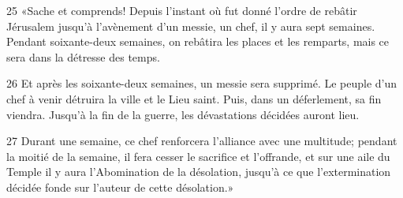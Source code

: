 
25 «Sache et comprends! Depuis l’instant où fut donné l’ordre de rebâtir Jérusalem jusqu’à l’avènement d’un messie, un chef, il y aura sept semaines. Pendant soixante-deux semaines, on rebâtira les places et les remparts, mais ce sera dans la détresse des temps.

26 Et après les soixante-deux semaines, un messie sera supprimé. Le peuple d’un chef à venir détruira la ville et le Lieu saint. Puis, dans un déferlement, sa fin viendra. Jusqu’à la fin de la guerre, les dévastations décidées auront lieu.

27 Durant une semaine, ce chef renforcera l’alliance avec une multitude; pendant la moitié de la semaine, il fera cesser le sacrifice et l’offrande, et sur une aile du Temple il y aura l’Abomination de la désolation, jusqu’à ce que l’extermination décidée fonde sur l’auteur de cette désolation.»